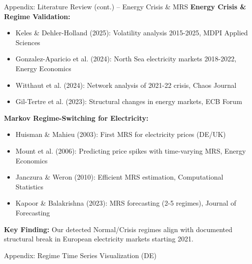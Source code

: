 \documentclass[aspectratio=169]{beamer}
\begin{document}
\begin{frame}{Appendix: Literature Review (cont.) -- Energy Crisis \& MRS}
\textbf{Energy Crisis \& Regime Validation:}
\begin{itemize}
    \item Keles \& Dehler-Holland (2025): Volatility analysis 2015-2025, MDPI Applied Sciences
    \item Gonzalez-Aparicio et al. (2024): North Sea electricity markets 2018-2022, Energy Economics
    \item Witthaut et al. (2024): Network analysis of 2021-22 crisis, Chaos Journal
    \item Gil-Tertre et al. (2023): Structural changes in energy markets, ECB Forum
\end{itemize}

\vspace{0.3cm}
\textbf{Markov Regime-Switching for Electricity:}
\begin{itemize}
    \item Huisman \& Mahieu (2003): First MRS for electricity prices (DE/UK)
    \item Mount et al. (2006): Predicting price spikes with time-varying MRS, Energy Economics
    \item Janczura \& Weron (2010): Efficient MRS estimation, Computational Statistics
    \item Kapoor \& Balakrishna (2023): MRS forecasting (2-5 regimes), Journal of Forecasting
\end{itemize}

\vspace{0.3cm}
\textbf{Key Finding:} Our detected Normal/Crisis regimes align with documented structural break in European electricity markets starting 2021.
\end{frame}

\begin{frame}{Appendix: Regime Time Series Visualization (DE)}
\begin{center}
\end{center}
\end{frame}
\end{document}
